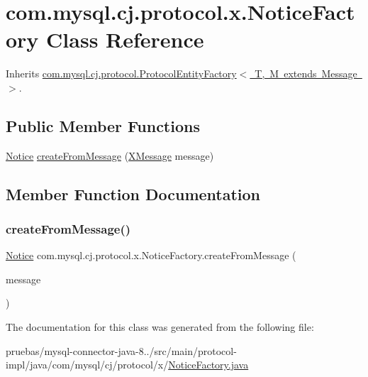 \hypertarget{classcom_1_1mysql_1_1cj_1_1protocol_1_1x_1_1_notice_factory}{}\section{com.\+mysql.\+cj.\+protocol.\+x.\+Notice\+Factory Class Reference}
\label{classcom_1_1mysql_1_1cj_1_1protocol_1_1x_1_1_notice_factory}


Inherits \mbox{\hyperlink{interfacecom_1_1mysql_1_1cj_1_1protocol_1_1_protocol_entity_factory}{com.\+mysql.\+cj.\+protocol.\+Protocol\+Entity\+Factory$<$ T, M extends Message $>$}}.

\subsection*{Public Member Functions}
\begin{DoxyCompactItemize}
\item 
\mbox{\hyperlink{classcom_1_1mysql_1_1cj_1_1protocol_1_1x_1_1_notice}{Notice}} \mbox{\hyperlink{classcom_1_1mysql_1_1cj_1_1protocol_1_1x_1_1_notice_factory_a4252032a446a845265c41258852d08e9}{create\+From\+Message}} (\mbox{\hyperlink{classcom_1_1mysql_1_1cj_1_1protocol_1_1x_1_1_x_message}{X\+Message}} message)
\end{DoxyCompactItemize}


\subsection{Member Function Documentation}
\mbox{\label{classcom_1_1mysql_1_1cj_1_1protocol_1_1x_1_1_notice_factory_a4252032a446a845265c41258852d08e9}} 
\subsubsection{\texorpdfstring{create\+From\+Message()}{createFromMessage()}}
{\footnotesize\ttfamily \mbox{\hyperlink{classcom_1_1mysql_1_1cj_1_1protocol_1_1x_1_1_notice}{Notice}} com.\+mysql.\+cj.\+protocol.\+x.\+Notice\+Factory.\+create\+From\+Message (\begin{DoxyParamCaption}\item[{\mbox{\hyperlink{classcom_1_1mysql_1_1cj_1_1protocol_1_1x_1_1_x_message}{X\+Message}}}]{message }\end{DoxyParamCaption})}



The documentation for this class was generated from the following file\+:\begin{DoxyCompactItemize}
\item 
pruebas/mysql-\/connector-\/java-\/8../src/main/protocol-\/impl/java/com/mysql/cj/protocol/x/\mbox{\hyperlink{_notice_factory_8java}{Notice\+Factory.\+java}}\end{DoxyCompactItemize}
